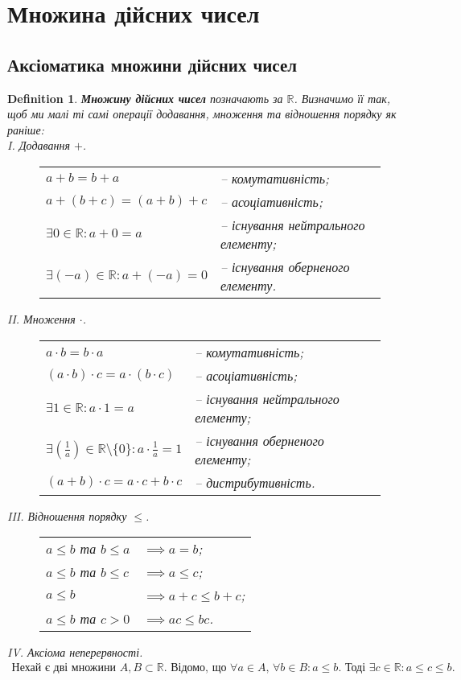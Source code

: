 \documentclass[a4paper, 14pt]{article}
\theoremstyle{theoremdd}
\theoremstyle{theoremdd}
\newtheorem{definition}[theorem]{Definition}
\theoremstyle{theoremdd}
\theoremstyle{theoremdd}
\theoremstyle{theoremdd}
\theoremstyle{theoremdd}
\theoremstyle{theoremdd}
\theoremstyle{theoremdd}
\begin{document}
	\section{Множина дійсних чисел}
	\subsection{Аксіоматика множини дійсних чисел}
	\begin{definition}
	\textbf{Множину дійсних чисел} позначають за $\mathbb{R}$. Визначимо її так, щоб ми малі ті самі операції додавання, множення та відношення порядку як раніше:\\
	I. Додавання $+$.
	\begin{figure}[H]
	\centering
	\begin{tabular}{ll}
	$a+b=b+a$ & -- комутативність;\\
	$a+(b+c)=(a+b)+c$ & -- асоціативність;\\
	$\exists 0 \in\mathbb{R}: a+0=a$ & -- існування нейтрального елементу;\\
	$\exists (-a) \in\mathbb{R}: a+(-a)=0$ & -- існування оберненого елементу.
	\end{tabular}
	\end{figure}
	II. Множення $\cdot$.
	\begin{figure}[H]
	\centering
	\begin{tabular}{ll}
	$a \cdot b=b \cdot a$ & -- комутативність;\\
	$(a \cdot b) \cdot c=a \cdot (b \cdot c)$ & -- асоціативність;\\
	$\exists 1 \in\mathbb{R}: a \cdot 1=a$ & -- існування нейтрального елементу;\\
	$\displaystyle \exists \left(\frac{1}{a}\right) \in\mathbb{R} \setminus \{0\}: a \cdot \frac{1}{a}=1$ & -- існування оберненого елементу;\\
	$(a+b) \cdot c = a \cdot c + b \cdot c$ & -- дистрибутивність.
	\end{tabular}
	\end{figure}
	III. Відношення порядку $\leq$.
	\begin{figure}[H]
	\centering
	\begin{tabular}{ll}
	$a \leq b$ та $b \leq a$ & $\implies a = b$;\\
	$a \leq b$ та $b \leq c$ & $\implies a \leq c$;\\
	$a \leq b$ & $\implies a+c \leq b+c$;\\
	$a \leq b$ та $c>0$ & $\implies ac \leq bc$.
	\end{tabular}
	\end{figure}
	IV. Аксіома неперервності.
	\begin{align*}
	\text{Нехай є дві множини $A,B \subset \mathbb{R}$. Відомо, що $\forall a \in A$, $\forall b \in B: a \leq b$. Тоді $\exists c \in \mathbb{R}: a \leq c \leq b$.}
	\end{align*}
	\end{definition}
	
\end{document}

